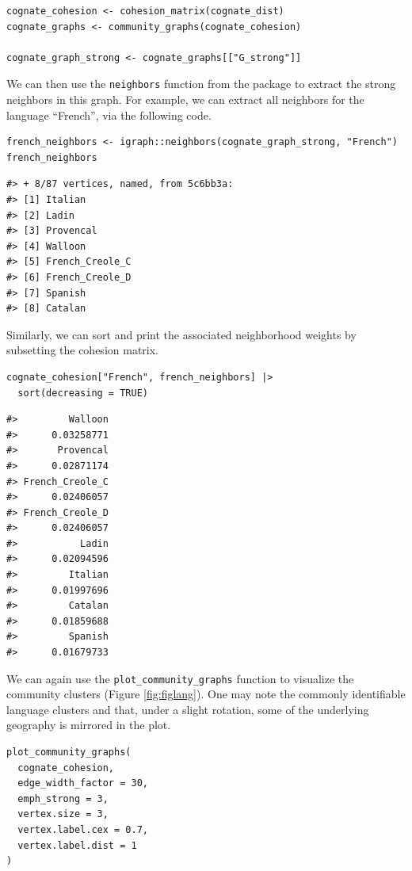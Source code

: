 \begin{verbatim}
cognate_cohesion <- cohesion_matrix(cognate_dist)
cognate_graphs <- community_graphs(cognate_cohesion)

cognate_graph_strong <- cognate_graphs[["G_strong"]]
\end{verbatim}

We can then use the \texttt{neighbors} function from the  package to extract the strong neighbors in this graph. For example, we can extract all neighbors for the language ``French'', via the following code.

\begin{verbatim}
french_neighbors <- igraph::neighbors(cognate_graph_strong, "French")
french_neighbors
\end{verbatim}

\begin{verbatim}
#> + 8/87 vertices, named, from 5c6bb3a:
#> [1] Italian
#> [2] Ladin
#> [3] Provencal
#> [4] Walloon
#> [5] French_Creole_C
#> [6] French_Creole_D
#> [7] Spanish
#> [8] Catalan
\end{verbatim}

Similarly, we can sort and print the associated neighborhood weights by subsetting the cohesion matrix.

\begin{verbatim}
cognate_cohesion["French", french_neighbors] |>
  sort(decreasing = TRUE)
\end{verbatim}

\begin{verbatim}
#>         Walloon
#>      0.03258771
#>       Provencal
#>      0.02871174
#> French_Creole_C
#>      0.02406057
#> French_Creole_D
#>      0.02406057
#>           Ladin
#>      0.02094596
#>         Italian
#>      0.01997696
#>         Catalan
#>      0.01859688
#>         Spanish
#>      0.01679733
\end{verbatim}

We can again use the \texttt{plot\_community\_graphs} function to visualize the community clusters (Figure \ref{fig:figlang}). One may note the commonly identifiable language clusters and that, under a slight rotation, some of the underlying geography is mirrored in the plot.

\begin{verbatim}
plot_community_graphs(
  cognate_cohesion,
  edge_width_factor = 30,
  emph_strong = 3,
  vertex.size = 3,
  vertex.label.cex = 0.7,
  vertex.label.dist = 1
)
\end{verbatim}

